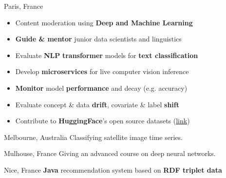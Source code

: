 \documentclass[10pt,a4paper,ragged2e]{altacv}
\begin{document}
\divider

     {Paris, France}
\begin{itemize}
	\item[-]  Content moderation using \textbf{Deep and Machine Learning}
	\item[-] \textbf{Guide \& mentor} junior data scientists and linguistics
	\item[-] Evaluate \textbf{NLP} \textbf{transformer} models for \textbf{text classification}  
	\item[-] Develop \textbf{microservices} for live computer vision inference 
	\item[-] \textbf{Monitor} model \textbf{performance} and decay (e.g. accuracy)
	\item[-] Evaluate concept \& data \textbf{drift}, covariate \& label \textbf{shift}
	\item[-] Contribute to \textbf{HuggingFace}'s open source datasets (\href{https://github.com/pulls?q=is%3Apr+author%3Ahfawaz+archived%3Afalse+is%3Aclosed+huggingface+is%3Amerged}{link})
\end{itemize}

\divider


     {Melbourne, Australia}
{Classifying satellite image time series.}\\
\divider

     {Mulhouse, France}
{Giving an advanced course on  deep neural networks.}\\

\divider

     {Nice, France}
\textbf{Java} recommendation system based on \textbf{RDF triplet data}

\divider
%
%

\printbibliography[heading=pubtype,title={\printinfo{\faFileTextO}{Journal Articles}}, type=article]




\end{document}
